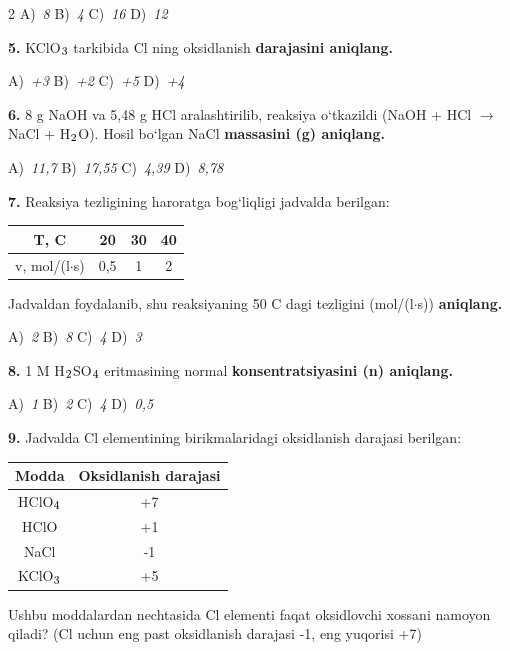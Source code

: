 \documentclass[11pt,a4paper]{article}
\renewcommand{\textsubscript}[1]{\ensuremath{_{\text{\fontsize{8}{8}\selectfont #1}}}}
\begin{document}
\begin{multicols}{2}
\noindent A)~\textsl{8} \hfill B)~\textsl{4} \hfill C)~\textsl{16} \hfill D)~\textsl{12}\par
\vspace{4pt}
\noindent\textbf{5.} KClO\textsubscript{3} tarkibida Cl ning oksidlanish \textbf{darajasini aniqlang.}

\noindent A)~\textsl{+3} \hfill B)~\textsl{+2} \hfill C)~\textsl{+5} \hfill D)~\textsl{+4}\par
\vspace{4pt}
\noindent\textbf{6.} 8 g NaOH va 5,48 g HCl aralashtirilib, reaksiya o`tkazildi (NaOH + HCl $\to$ NaCl + H\textsubscript{2}O). Hosil bo`lgan NaCl \textbf{massasini (g) aniqlang.}

\noindent A)~\textsl{11,7} \hfill B)~\textsl{17,55} \hfill C)~\textsl{4,39} \hfill D)~\textsl{8,78}\par
\vspace{4pt}
\noindent\textbf{7.} Reaksiya tezligining haroratga bog`liqligi jadvalda berilgan:
\begin{center}
\renewcommand{\arraystretch}{1.15}
\begin{tabular}{|c|c|c|c|}\hline
\textbf{T, \textdegree{}C} & \textbf{20} & \textbf{30} & \textbf{40} \\ \hline
v, mol/(l$\cdot$s) & 0,5 & 1 & 2 \\ \hline
\end{tabular}
\end{center}
Jadvaldan foydalanib, shu reaksiyaning 50 \textdegree{}C dagi tezligini (mol/(l$\cdot$s)) \textbf{aniqlang.}

\noindent A)~\textsl{2} \hfill B)~\textsl{8} \hfill C)~\textsl{4} \hfill D)~\textsl{3}\par
\vspace{4pt}
\noindent\textbf{8.} 1 M H\textsubscript{2}SO\textsubscript{4} eritmasining normal \textbf{konsentratsiyasini (n) aniqlang.}

\noindent A)~\textsl{1} \hfill B)~\textsl{2} \hfill C)~\textsl{4} \hfill D)~\textsl{0,5}\par
\vspace{4pt}
\noindent\textbf{9.} Jadvalda Cl elementining birikmalaridagi oksidlanish darajasi berilgan:
\begin{center}
\renewcommand{\arraystretch}{1.15}
\begin{tabular}{|c|c|}\hline
\textbf{Modda} & \textbf{Oksidlanish darajasi} \\ \hline
HClO\textsubscript{4} & +7 \\ \hline
HClO & +1 \\ \hline
NaCl & -1 \\ \hline
KClO\textsubscript{3} & +5 \\ \hline
\end{tabular}
\end{center}
Ushbu moddalardan nechtasida Cl elementi faqat oksidlovchi xossani namoyon qiladi? (Cl uchun eng past oksidlanish darajasi -1, eng yuqorisi +7)


\end{multicols}
\end{document}
